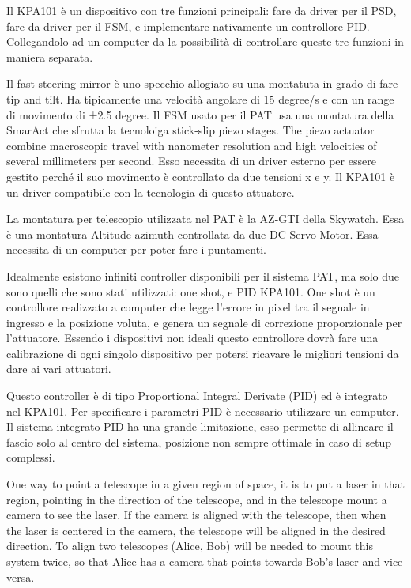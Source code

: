 Il KPA101 è un dispositivo con tre funzioni principali: fare da driver per il PSD, fare da driver per il FSM, e implementare nativamente un controllore PID. Collegandolo ad un computer da la possibilità di controllare queste tre funzioni in maniera separata.


Il fast-steering mirror è uno specchio allogiato su una montatuta in grado di fare tip and tilt. Ha tipicamente una velocità angolare di 15 degree/s e con un range di movimento di ±2.5 degree. Il FSM usato per il PAT usa una montatura della SmarAct che sfrutta la tecnoloiga stick-slip piezo stages. The piezo actuator combine macroscopic travel with nanometer resolution and high velocities of several millimeters per second. Esso necessita di un driver esterno per essere gestito perché il suo movimento è controllato da due tensioni x e y. Il KPA101 è un driver compatibile con la tecnologia di questo attuatore.

La montatura per telescopio utilizzata nel PAT è la AZ-GTI della Skywatch. Essa è una montatura Altitude-azimuth controllata da due DC Servo Motor. Essa necessita di un computer per poter fare i puntamenti.

Idealmente esistono infiniti controller disponibili per il sistema PAT, ma solo due sono quelli che sono stati utilizzati: one shot, e PID KPA101.
One shot è un controllore realizzato a computer che legge l'errore in pixel tra il segnale in ingresso e la posizione voluta, e genera un segnale di correzione proporzionale per l'attuatore.
Essendo i dispositivi non ideali questo controllore dovrà fare una calibrazione di ogni singolo dispositivo per potersi ricavare le migliori tensioni da dare ai vari attuatori.

Questo controller è di tipo Proportional Integral Derivate (PID) ed è integrato nel KPA101. Per specificare i parametri PID è necessario utilizzare un computer. Il sistema integrato PID ha una grande limitazione, esso permette di allineare il fascio solo al centro del sistema, posizione non sempre ottimale in caso di setup complessi.

One way to point a telescope in a given region of space, it is to put a laser in that region, pointing in the direction of the telescope, and in the telescope mount a camera to see the laser.
If the camera is aligned with the telescope, then when the laser is centered in the camera, the telescope will be aligned in the desired direction.
To align two telescopes (Alice, Bob) will be needed to mount this system twice, so that Alice has a camera that points towards Bob’s laser and vice versa.

